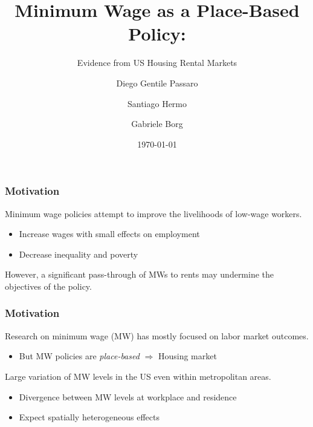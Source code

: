 \documentclass[aspectratio=169, t]{beamer}
\title{Minimum Wage as a Place-Based Policy:}
\subtitle{Evidence from US Housing Rental Markets}
\date{\today}
\author{Diego Gentile Passaro \and Santiago Hermo \and Gabriele Borg}
\institute{Brown University $ \quad\quad\quad\quad $ Brown University $ \quad\quad\quad\quad$  AWS}
\begin{document}
\maketitle



\begin{frame}
    \frametitle{Motivation}
    
    Minimum wage policies attempt to improve the livelihoods of low-wage workers.
    \begin{itemize}
        \item Increase wages with small effects on employment
        {\small \color{gray} \parencite[e.g.,][]{CegnizEtAl2019}}
        \item Decrease inequality {\small \color{gray} \textcite{AutorEtAl2016}}
        and poverty {\small \color{gray} \textcite{Dube2019Income}}
    \end{itemize}

    \vspace{2mm}
    \pause
    However, %
    a significant pass-through of MWs to rents may undermine the objectives of the policy.
    

\end{frame}

\begin{frame}
    \frametitle{Motivation}
    
    Research on minimum wage (MW) has mostly focused on labor market outcomes.
    
    \begin{itemize}
        \item But MW policies are \textit{place-based} $\Rightarrow$ Housing market
    \end{itemize}

    \pause
    \vspace{3mm}
    Large variation of MW levels in the US even within metropolitan areas.
    
    \begin{itemize}
        \item Divergence between MW levels at workplace and residence
        \item Expect spatially heterogeneous effects
    \end{itemize}
\end{frame}
\end{document}

